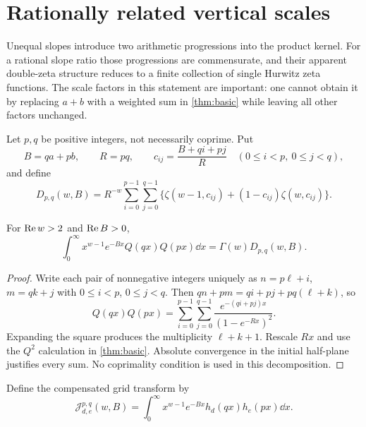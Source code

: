 \section{Rationally related vertical scales}
\label{sec:rational-scales}

Unequal slopes introduce two arithmetic progressions into the product
kernel. For a rational slope ratio those progressions are commensurate,
and their apparent double-zeta structure reduces to a finite collection
of single Hurwitz zeta functions. The scale factors in this statement
are important: one cannot obtain it by replacing $a+b$ with a weighted
sum in \cref{thm:basic} while leaving all other factors unchanged.

Let $p,q$ be positive integers, not necessarily coprime. Put
\begin{equation}\label{eq:rational-grid}
 B=qa+pb,\qquad R=pq,\qquad
 c_{ij}=\frac{B+qi+pj}{R}\quad(0\le i<p,\ 0\le j<q),
\end{equation}
and define
\begin{equation}\label{eq:Dpq}
 D_{p,q}(w,B)=R^{-w}\sum_{i=0}^{p-1}\sum_{j=0}^{q-1}
       \{\zeta(w-1,c_{ij})+(1-c_{ij})\zeta(w,c_{ij})\}.
\end{equation}

\begin{lemma}\label{thm:grid}
For $\operatorname{Re} w>2$ and $\operatorname{Re} B>0$,
\begin{equation}\label{eq:QQ-grid}
 \int_0^\infty x^{w-1}e^{-Bx}Q(qx)Q(px)\dd x
                 =\Gamma(w)D_{p,q}(w,B).
\end{equation}
\end{lemma}
\begin{proof}
Write each pair of nonnegative integers uniquely as
$n=p\ell+i$, $m=qk+j$ with $0\le i<p$, $0\le j<q$.
Then $qn+pm=qi+pj+pq(\ell+k)$, so
\[
 Q(qx)Q(px)=\sum_{i=0}^{p-1}\sum_{j=0}^{q-1}
              \frac{e^{-(qi+pj)x}}{(1-e^{-Rx})^2}.
\]
Expanding the square produces the multiplicity $\ell+k+1$.
Rescale $Rx$ and use the $Q^2$ calculation in \cref{thm:basic}.
Absolute convergence in the initial half-plane justifies every sum.
No coprimality condition is used in this decomposition.
\end{proof}

Define the compensated grid transform by
\begin{equation}\label{eq:Jpq-integral}
 \mathcal J_{d,e}^{p,q}(w,B)=\int_0^\infty
             x^{w-1}e^{-Bx}h_d(qx)h_e(px)\dd x.
\end{equation}

